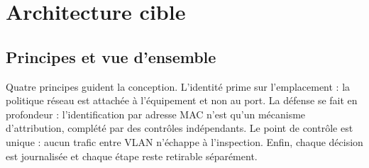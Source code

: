 \documentclass[11pt,a4paper]{article}
\begin{document}
\section{Architecture cible}

\subsection{Principes et vue d'ensemble}
Quatre principes guident la conception. L'identité prime sur l'emplacement : la politique réseau est attachée à l'équipement et non au port. La défense se fait en profondeur : l'identification par adresse MAC n'est qu'un mécanisme d'attribution, complété par des contrôles indépendants. Le point de contrôle est unique : aucun trafic entre VLAN n'échappe à l'inspection. Enfin, chaque décision est journalisée et chaque étape reste retirable séparément.
\end{document}
